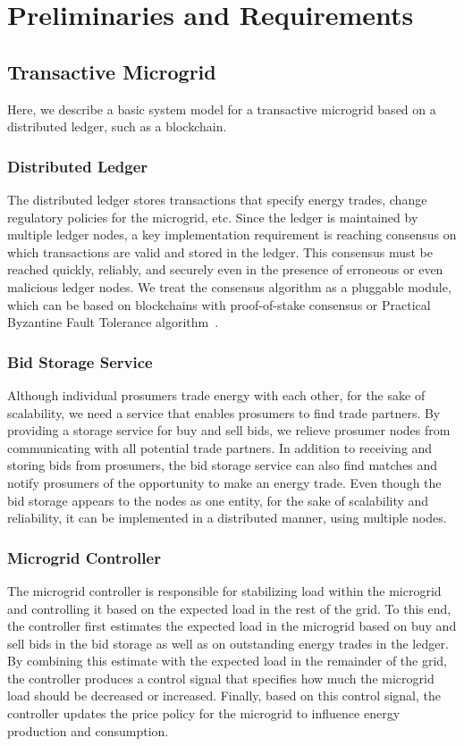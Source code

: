 \section{Preliminaries and Requirements}

\subsection{Transactive Microgrid}

Here, we describe a basic system model for a transactive microgrid based on a distributed ledger, such as a blockchain.

\subsubsection{Distributed Ledger}
The distributed ledger stores transactions that specify energy trades, change regulatory policies for the microgrid, etc.
Since the ledger is maintained by multiple ledger nodes, a key implementation requirement is reaching consensus on which transactions are valid and stored in the ledger.
This consensus must be reached quickly, reliably, and securely even in the presence of erroneous or even malicious ledger nodes.
We treat the consensus algorithm as a pluggable module, which can be based on blockchains with proof-of-stake consensus or Practical Byzantine Fault Tolerance algorithm~\cite{castro1999practical}.

\subsubsection{Bid Storage Service}
Although individual prosumers trade energy with each other, for the sake of scalability, we need a service that enables prosumers to find trade partners.
By providing a storage service for buy and sell bids, we relieve prosumer nodes from communicating with all potential trade partners.
In addition to receiving and storing bids from prosumers, the bid storage service can also find matches and notify prosumers of the opportunity to make an energy trade.
Even though the bid storage appears to the nodes as one entity, for the sake of scalability and reliability, it can be implemented in a distributed manner, using multiple nodes.

\subsubsection{Microgrid Controller}
The microgrid controller is responsible for stabilizing load within the microgrid and controlling it based on the expected load in the rest of the grid.
To this end, the controller first estimates the expected load in the microgrid based on buy and sell bids in the bid storage as well as on outstanding energy trades in the ledger.
By combining this estimate with the expected load in the remainder of the grid, the controller produces a control signal that specifies how much the microgrid load should be decreased or increased.
Finally, based on this control signal, the controller updates the price policy for the microgrid to influence energy production and consumption.



